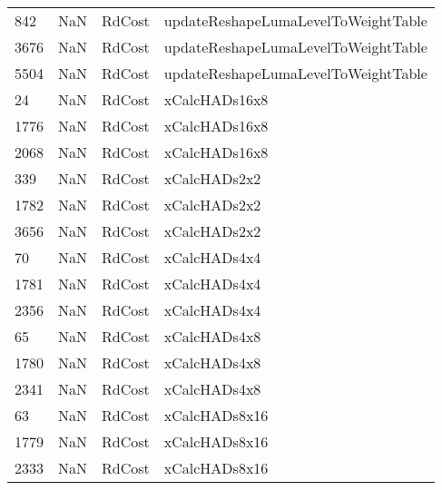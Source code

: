 \begin{tabular}{llll}
842  &                   NaN &                     RdCost &       updateReshapeLumaLevelToWeightTable \\
3676 &                   NaN &                     RdCost &       updateReshapeLumaLevelToWeightTable \\
5504 &                   NaN &                     RdCost &       updateReshapeLumaLevelToWeightTable \\
24   &                   NaN &                     RdCost &                             xCalcHADs16x8 \\
1776 &                   NaN &                     RdCost &                             xCalcHADs16x8 \\
2068 &                   NaN &                     RdCost &                             xCalcHADs16x8 \\
339  &                   NaN &                     RdCost &                              xCalcHADs2x2 \\
1782 &                   NaN &                     RdCost &                              xCalcHADs2x2 \\
3656 &                   NaN &                     RdCost &                              xCalcHADs2x2 \\
70   &                   NaN &                     RdCost &                              xCalcHADs4x4 \\
1781 &                   NaN &                     RdCost &                              xCalcHADs4x4 \\
2356 &                   NaN &                     RdCost &                              xCalcHADs4x4 \\
65   &                   NaN &                     RdCost &                              xCalcHADs4x8 \\
1780 &                   NaN &                     RdCost &                              xCalcHADs4x8 \\
2341 &                   NaN &                     RdCost &                              xCalcHADs4x8 \\
63   &                   NaN &                     RdCost &                             xCalcHADs8x16 \\
1779 &                   NaN &                     RdCost &                             xCalcHADs8x16 \\
2333 &                   NaN &                     RdCost &                             xCalcHADs8x16 \\

\end{tabular}
